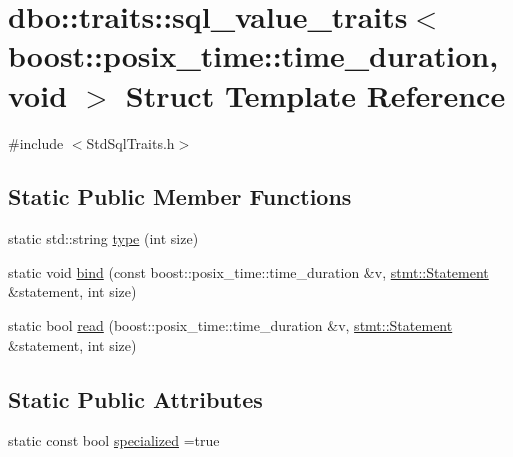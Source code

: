 \hypertarget{structdbo_1_1traits_1_1sql__value__traits_3_01boost_1_1posix__time_1_1time__duration_00_01void_01_4}{\section{dbo\+:\+:traits\+:\+:sql\+\_\+value\+\_\+traits$<$ boost\+:\+:posix\+\_\+time\+:\+:time\+\_\+duration, void $>$ Struct Template Reference}
\label{structdbo_1_1traits_1_1sql__value__traits_3_01boost_1_1posix__time_1_1time__duration_00_01void_01_4}
}


{\ttfamily \#include $<$Std\+Sql\+Traits.\+h$>$}

\subsection*{Static Public Member Functions}
\begin{DoxyCompactItemize}
\item 
static std\+::string \hyperlink{structdbo_1_1traits_1_1sql__value__traits_3_01boost_1_1posix__time_1_1time__duration_00_01void_01_4_acb88a82ea016a74ca71e27a70fa38924}{type} (int size)
\item 
static void \hyperlink{structdbo_1_1traits_1_1sql__value__traits_3_01boost_1_1posix__time_1_1time__duration_00_01void_01_4_af65974cface820286b00f967f5d8b098}{bind} (const boost\+::posix\+\_\+time\+::time\+\_\+duration \&v, \hyperlink{classdbo_1_1stmt_1_1_statement}{stmt\+::\+Statement} \&statement, int size)
\item 
static bool \hyperlink{structdbo_1_1traits_1_1sql__value__traits_3_01boost_1_1posix__time_1_1time__duration_00_01void_01_4_a802e9772aa324a9bc325d556c880edca}{read} (boost\+::posix\+\_\+time\+::time\+\_\+duration \&v, \hyperlink{classdbo_1_1stmt_1_1_statement}{stmt\+::\+Statement} \&statement, int size)
\end{DoxyCompactItemize}
\subsection*{Static Public Attributes}
\begin{DoxyCompactItemize}
\item 
static const bool \hyperlink{structdbo_1_1traits_1_1sql__value__traits_3_01boost_1_1posix__time_1_1time__duration_00_01void_01_4_a9609f25162cf8a776ced510581a9ed52}{specialized} =true
\end{DoxyCompactItemize}


